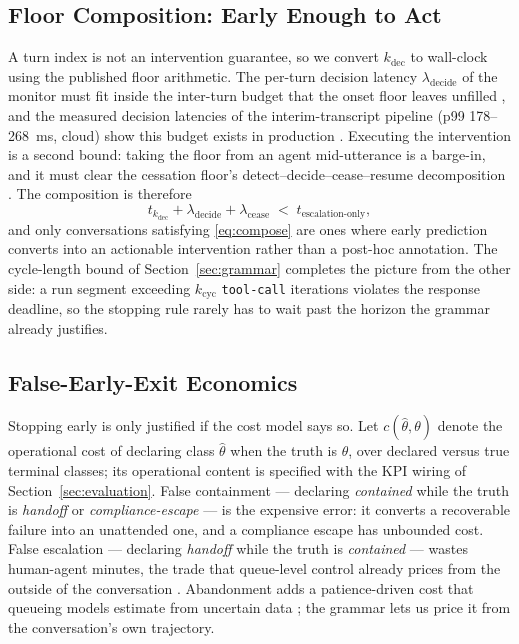 \subsection{Floor Composition: Early Enough to Act}
\label{subsec:floors}
A turn index is not an intervention guarantee, so we convert $k_{\mathrm{dec}}$ to wall-clock using the published floor arithmetic.
The per-turn decision latency $\lambda_{\mathrm{decide}}$ of the monitor must fit inside the inter-turn budget that the onset floor leaves unfilled \citep{garcia2026latencyfloor}, and the measured decision latencies of the interim-transcript pipeline (p99 178--268~ms, cloud) show this budget exists in production \citep{garcia2026asking}.
Executing the intervention is a second bound: taking the floor from an agent mid-utterance is a barge-in, and it must clear the cessation floor's detect--decide--cease--resume decomposition \citep{garcia2026cessationfloor}.
The composition is therefore
\begin{equation}
  \label{eq:compose}
  t_{k_{\mathrm{dec}}} + \lambda_{\mathrm{decide}} + \lambda_{\mathrm{cease}}
  \;<\;
  t_{\mathrm{escalation\text{-}only}},
\end{equation}
and only conversations satisfying \eqref{eq:compose} are ones where early prediction converts into an actionable intervention rather than a post-hoc annotation.
The cycle-length bound of Section~\ref{sec:grammar} completes the picture from the other side: a run segment exceeding $k_{\mathrm{cyc}}$ \texttt{tool-call} iterations violates the response deadline, so the stopping rule rarely has to wait past the horizon the grammar already justifies.

\subsection{False-Early-Exit Economics}
\label{subsec:economics}
Stopping early is only justified if the cost model says so.
Let $c(\hat{\theta}, \theta)$ denote the operational cost of declaring class $\hat{\theta}$ when the truth is $\theta$, over declared versus true terminal classes; its operational content is specified with the KPI wiring of Section~\ref{sec:evaluation}.
False containment --- declaring \textit{contained} while the truth is \textit{handoff} or \textit{compliance-escape} --- is the expensive error: it converts a recoverable failure into an unattended one, and a compliance escape has unbounded cost.
False escalation --- declaring \textit{handoff} while the truth is \textit{contained} --- wastes human-agent minutes, the trade that queue-level control already prices from the outside of the conversation \citep{queuecontrol2026}.
Abandonment adds a patience-driven cost that queueing models estimate from uncertain data \citep{silentabandonment2024}; the grammar lets us price it from the conversation's own trajectory.

